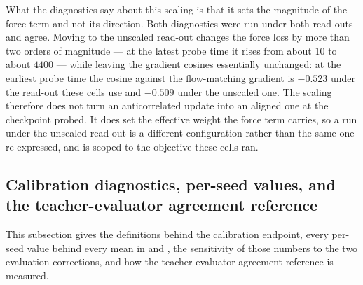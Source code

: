 What the diagnostics say about this scaling is that it sets the magnitude of the force
term and not its direction. Both diagnostics were run under both read-outs and agree.
Moving to the unscaled read-out changes the force loss by more than two orders of
magnitude --- at the latest probe time it rises from about $10$ to about $4400$ --- while
leaving the gradient cosines essentially unchanged: at the earliest probe time the cosine
against the flow-matching gradient is $-0.523$ under the read-out these cells use and
$-0.509$ under the unscaled one. The scaling therefore does not turn an anticorrelated
update into an aligned one at the checkpoint probed. It does set the effective weight the
force term carries, so a run under the unscaled read-out is a different configuration
rather than the same one re-expressed, and  is scoped to the objective
these cells ran.

\subsection{Calibration diagnostics, per-seed values, and the teacher-evaluator agreement reference}
\label{app:scalediag}

This subsection gives the definitions behind the calibration endpoint, every
per-seed value behind every mean in  and ,
the sensitivity of those numbers to the two evaluation corrections, and how the
teacher-evaluator agreement reference is measured.

